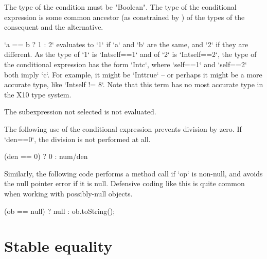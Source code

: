 The type of the condition must be \xcd"Boolean".
The type of the conditional expression is some common 
ancestor (as constrained by ) of the types of the consequent and the
alternative. 

\begin{ex}
\xcd`a == b ? 1 : 2`
evaluates to \xcd`1` if \xcd`a` and \xcd`b` are the same, and \xcd`2` if they
are different.   As the type of \xcd`1` is \xcd`Int{self==1}` and of \xcd`2`
is \xcd`Int{self==2}`, the type of the conditional expression has the form
\xcd`Int{c}`, where \xcd`self==1` and \xcd`self==2` both imply \xcd`c`.  For
example, it might be \xcd`Int{true}` -- or perhaps it might be a more accurate
type, like \xcd`Int{self != 8}`. Note that this term has no most accurate type
in the X10 type system.
\end{ex}

The subexpression not selected is not evaluated.

\begin{ex}
The following use of the conditional expression prevents division by zero.  If
\xcd`den==0`, the division is not performed at all.
\begin{xten}
(den == 0) ? 0 : num/den
\end{xten}

Similarly, the following code performs a method call if \xcd`op` is non-null,
and avoids the null pointer error if it is null.  Defensive coding like this
is quite common when working with possibly-null objects.
\begin{xten}
(ob == null) ? null : ob.toString();
\end{xten}



\end{ex}

\section{Stable equality}
\label{StableEquality}
\index{\Xcd{==}}

